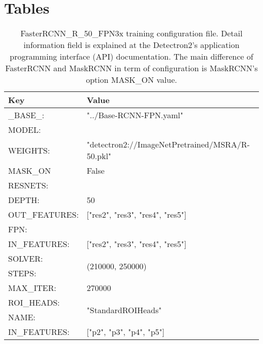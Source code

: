 \chapter{Tables}
\begin{table}
	\label{tab:fastConfig}
	\begin{tabular}{|l|l|}
		\hline
		Key            & Value                                           \\ \hline
		\_BASE\_:      & "../Base-RCNN-FPN.yaml"                         \\ \hline
		MODEL:         &                                                 \\ \hline
		WEIGHTS:       & "detectron2://ImageNetPretrained/MSRA/R-50.pkl" \\ \hline
		MASK\_ON       & False                                           \\ \hline
		RESNETS:       &                                                 \\ \hline
		DEPTH:         & 50                                              \\ \hline
		OUT\_FEATURES: & {[}"res2", "res3", "res4",   "res5"{]}          \\ \hline
		FPN:           &                                                 \\ \hline
		IN\_FEATURES:  & {[}"res2", "res3", "res4",   "res5"{]}          \\ \hline
		SOLVER:        & \multirow{2}{*}{(210000, 250000)}               \\ \cline{1-1}
		STEPS:         &                                                 \\ \hline
		MAX\_ITER:     & 270000                                          \\ \hline
		ROI\_HEADS:    & \multirow{2}{*}{"StandardROIHeads"}             \\ \cline{1-1}
		NAME:          &                                                 \\ \hline
		IN\_FEATURES:  & {[}"p2", "p3", "p4",   "p5"{]}                  \\ \hline
	\end{tabular}
	\caption{FasterRCNN\_R\_50\_FPN3x training configuration file. Detail information field is explained at the Detectron2's application programming interface (API) documentation. The main difference of FasterRCNN and MaskRCNN in term of configuration is MaskRCNN's option MASK\_ON value.}
\end{table}

